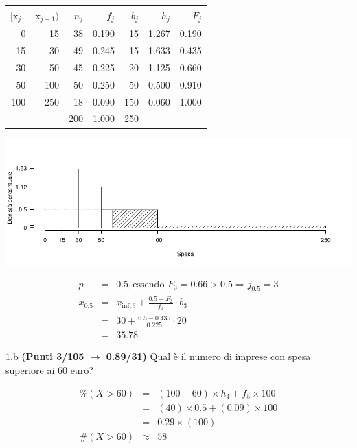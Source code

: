 \documentclass[
  11pt,
]{book}
\theoremstyle{mytheoremstyle}
\theoremstyle{mydefstyle}
\newenvironment{sol}
  {
  \begin{tcolorbox}[enhanced,breakable,arc=0.1mm,boxrule=1pt,colback=white,colframe=iblue,
  title=\bf \fontfamily{lmss}\selectfont \hspace{.5 cm} Soluzione,drop fuzzy shadow]

}{
\end{tcolorbox}
  }
\begin{document}
\begin{sol}

\begin{table}[H]
\centering
\begin{tabular}{rrrrrrr}
\toprule
$[\text{x}_j,$ & $\text{x}_{j+1})$ & $n_j$ & $f_j$ & $b_j$ & $h_j$ & $F_j$\\
\midrule
0 & 15 & 38 & 0.190 & 15 & 1.267 & 0.190\\
15 & 30 & 49 & 0.245 & 15 & 1.633 & 0.435\\
30 & 50 & 45 & 0.225 & 20 & 1.125 & 0.660\\
50 & 100 & 50 & 0.250 & 50 & 0.500 & 0.910\\
100 & 250 & 18 & 0.090 & 150 & 0.060 & 1.000\\
 &  & 200 & 1.000 & 250 &  & \\
\bottomrule
\end{tabular}
\end{table}

\begin{center}\includegraphics{Esami_passati_con_soluzioni_files/figure-latex/2023-76,-1} \end{center}

\begin{eqnarray*}
  p &=&  0.5 , \text{essendo }F_{ 3 }= 0.66  > 0.5  \Rightarrow j_{ 0.5 }= 3 \\
  x_{ 0.5 } &=& x_{\text{inf}; 3 } + \frac{ { 0.5 } - F_{ 2 }} {f_{ 3 }} \cdot b_{ 3 } \\
            &=&  30  + \frac {{ 0.5 } -  0.435 } { 0.225 } \cdot  20  \\
            &=&  35.78 
\end{eqnarray*}

\end{sol}

1.b \textbf{(Punti 3/105 \(\rightarrow\) 0.89/31)} Qual è il numero di imprese con spesa superiore ai 60 euro?

\begin{sol}
\begin{eqnarray*}
     \%(X> 60 ) &=& ( 100 - 60 )\times h_{ 4 }+ f_{ 5 }\times 100 \\
              &=& ( 40 )\times 0.5 + ( 0.09 )\times 100 \\
              &=&  0.29 \times(100)\\
     \#(X> 60 ) &\approx& 58 
         \end{eqnarray*}

\end{sol}
\end{document}
